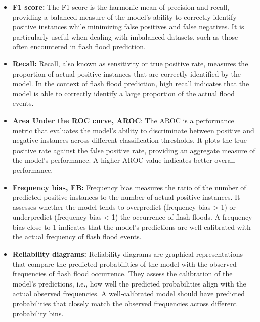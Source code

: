 \begin{itemize}
  \item \textbf{F1 score:} The F1 score is the harmonic mean of precision and recall, providing a balanced measure of the model's ability to correctly identify positive instances while minimizing false positives and false negatives. It is particularly useful when dealing with imbalanced datasets, such as those often encountered in flash flood prediction.
  \item \textbf{Recall:} Recall, also known as sensitivity or true positive rate, measures the proportion of actual positive instances that are correctly identified by the model. In the context of flash flood prediction, high recall indicates that the model is able to correctly identify a large proportion of the actual flood events.
  \item \textbf{Area Under the ROC curve, AROC}: The AROC is a performance metric that evaluates the model's ability to discriminate between positive and negative instances across different classification thresholds. It plots the true positive rate against the false positive rate, providing an aggregate measure of the model's performance. A higher AROC value indicates better overall performance.
  \item \textbf{Frequency bias, FB:} Frequency bias measures the ratio of the number of predicted positive instances to the number of actual positive instances. It assesses whether the model tends to overpredict (frequency bias > 1) or underpredict (frequency bias < 1) the occurrence of flash floods. A frequency bias close to 1 indicates that the model's predictions are well-calibrated with the actual frequency of flash flood events.
  \item \textbf{Reliability diagrams:} Reliability diagrams are graphical representations that compare the predicted probabilities of the model with the observed frequencies of flash flood occurrence. They assess the calibration of the model's predictions, i.e., how well the predicted probabilities align with the actual observed frequencies. A well-calibrated model should have predicted probabilities that closely match the observed frequencies across different probability bins.

\end{itemize}
